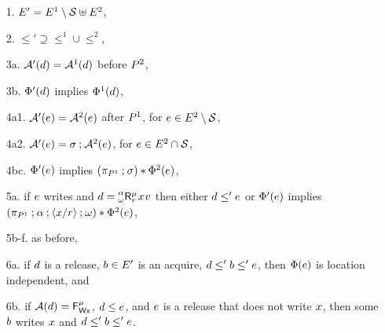 \begin{definition}
\begin{enumerate}
\item[1.] $\Event' = \Event^1\setminus\Sub \uplus \Event^2$,
\item[2.] ${\le'}\supseteq{\le^1}\cup{\le^2}$, 
\item[3a.] $\labelingAct'(\bEv) = \labelingAct^1(\bEv)$ before $\aPS^2$,
\item[3b.] $\labelingForm'(\bEv)$ implies $\labelingForm^1(\bEv)$,
\item[4a1.] $\labelingAct'(\aEv) = \labelingAct^2(\aEv)$  after $\aPS^1$,  for $\aEv\in\Event^2\setminus\Sub$,
\item[4a2.] $\labelingAct'(\aEv) =  \aSubC\SUBSEQ\labelingAct^2(\aEv)$,  for $\aEv\in\Event^2\cap\Sub$, 
\item[4bc.] $\labelingForm'(\aEv)$ implies
  $(\SUBDRS{\aPS^1} \SUBSEQ \aSubC)\SUBAPP\labelingForm^2(\aEv)$, 
\item[5a.] if $\aEv$ writes and
  $\bEv=\DRreg[\amode]{\aReg}{\beforeSub}{\afterSub}{\aLoc}{\aVal}$
  then either $\bEv\le'\aEv$ or
  $\labelingForm'(\aEv)$ implies  
  $(\SUBDRS{\aPS^1}\SUBSEQ \beforeSub \SUBSEQ \SUB{\aLoc/\aReg} \SUBSEQ \afterSub)\SUBAPP\labelingForm^2(\aEv)$,
\item[5b-f.] as before,
\item[6a.] if $\bEv$ is a release, $\dEv\in\Event'$ is an acquire,
  $\bEv\le'\dEv\le'\aEv$, then $\labelingForm(\aEv)$ is location independent, and
\item[6b.] if $\labelingAct(\bEv)=\DFW[\aLoc]{\amode}$, $\bEv\le\aEv$, and
  $\aEv$ is a release that does not write $\aLoc$, then  some
  $\dEv$ writes $\aLoc$ and $\bEv\le'\dEv\le'\aEv$. %

\end{enumerate}
\end{definition}
